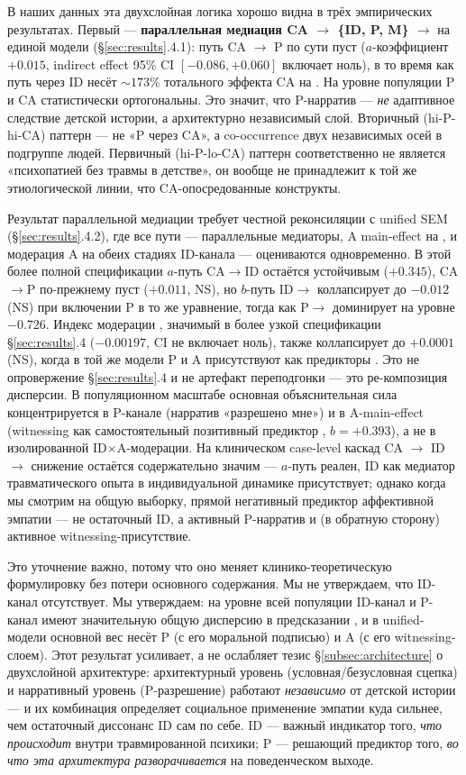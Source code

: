 В наших данных эта двухслойная логика хорошо видна в трёх эмпирических результатах. Первый --- \textbf{параллельная медиация CA $\to$ \{ID, P, M\} $\to$ \EAF{}} на единой модели (§\ref{sec:results}.4.1): путь CA $\to$ P по сути пуст ($a$-коэффициент $+0.015$, indirect effect 95\% CI $[-0.086, +0.060]$ включает ноль), в то время как путь через ID несёт $\sim 173\%$ тотального эффекта CA на \EAF{}. На уровне популяции P и CA статистически ортогональны. Это значит, что P-нарратив --- \emph{не} адаптивное следствие детской истории, а архитектурно независимый слой. Вторичный (hi-P-hi-CA) паттерн --- не «P через CA», а co-occurrence двух независимых осей в подгруппе людей. Первичный (hi-P-lo-CA) паттерн соответственно не является «психопатией без травмы в детстве», он вообще не принадлежит к той же этиологической линии, что CA-опосредованные конструкты.

Результат параллельной медиации требует честной реконсиляции с unified SEM (§\ref{sec:results}.4.2), где все пути --- параллельные медиаторы, A main-effect на \EAF{}, и модерация A на обеих стадиях ID-канала --- оцениваются одновременно. В этой более полной спецификации $a$-путь CA$\to$ID остаётся устойчивым ($+0.345$), CA$\to$P по-прежнему пуст ($+0.011$, NS), но $b$-путь ID$\to$\EAF{} коллапсирует до $-0.012$ (NS) при включении P в то же уравнение, тогда как P$\to$\EAF{} доминирует на уровне $-0.726$. Индекс модерации \IMM{}, значимый в более узкой спецификации §\ref{sec:results}.4 ($-0.00197$, CI не включает ноль), также коллапсирует до $+0.0001$ (NS), когда в той же модели P и A присутствуют как предикторы \EAF{}. Это не опровержение §\ref{sec:results}.4 и не артефакт переподгонки --- это ре-композиция дисперсии. В популяционном масштабе основная объяснительная сила \EAF{} концентрируется в P-канале (нарратив «разрешено мне») и в A-main-effect (witnessing как самостоятельный позитивный предиктор \EAF{}, $b = +0.393$), а не в изолированной ID$\times$A-модерации. На клиническом case-level каскад CA $\to$ ID $\to$ снижение \EAF{} остаётся содержательно значим --- $a$-путь реален, ID как медиатор травматического опыта в индивидуальной динамике присутствует; однако когда мы смотрим на общую выборку, прямой негативный предиктор аффективной эмпатии --- не остаточный ID, а активный P-нарратив и (в обратную сторону) активное witnessing-присутствие.

Это уточнение важно, потому что оно меняет клинико-теоретическую формулировку без потери основного содержания. Мы не утверждаем, что ID-канал отсутствует. Мы утверждаем: на уровне всей популяции ID-канал и P-канал имеют значительную общую дисперсию в предсказании \EAF{}, и в unified-модели основной вес несёт P (с его моральной подписью) и A (с его witnessing-слоем). Этот результат усиливает, а не ослабляет тезис §\ref{subsec:architecture} о двухслойной архитектуре: архитектурный уровень (условная/безусловная сцепка) и нарративный уровень (P-разрешение) работают \emph{независимо} от детской истории --- и их комбинация определяет социальное применение эмпатии куда сильнее, чем остаточный диссонанс ID сам по себе. ID --- важный индикатор того, \emph{что происходит} внутри травмированной психики; P --- решающий предиктор того, \emph{во что эта архитектура разворачивается} на поведенческом выходе.

